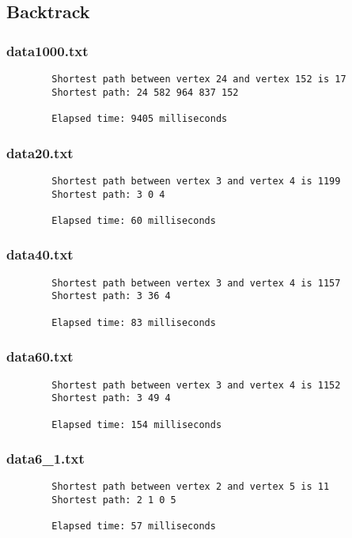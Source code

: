 \documentclass{article}
\begin{document}
    \subsection*{Backtrack}

    \subsubsection*{data1000.txt}
    \begin{verbatim}
        Shortest path between vertex 24 and vertex 152 is 17
        Shortest path: 24 582 964 837 152

        Elapsed time: 9405 milliseconds
    \end{verbatim}

    \subsubsection*{data20.txt}
    \begin{verbatim}
        Shortest path between vertex 3 and vertex 4 is 1199
        Shortest path: 3 0 4

        Elapsed time: 60 milliseconds
    \end{verbatim}

    \subsubsection*{data40.txt}
    \begin{verbatim}
        Shortest path between vertex 3 and vertex 4 is 1157
        Shortest path: 3 36 4

        Elapsed time: 83 milliseconds
    \end{verbatim}

    \subsubsection*{data60.txt}
    \begin{verbatim}
        Shortest path between vertex 3 and vertex 4 is 1152
        Shortest path: 3 49 4

        Elapsed time: 154 milliseconds
    \end{verbatim}

    \subsubsection*{data6_1.txt}
    \begin{verbatim}
        Shortest path between vertex 2 and vertex 5 is 11
        Shortest path: 2 1 0 5

        Elapsed time: 57 milliseconds
    \end{verbatim}
\end{document}
